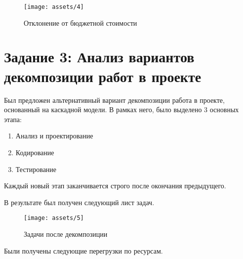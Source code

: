 \begin{figure}[H]
    \begin{center}
    \texttt{[image: assets/4]}
    \caption{Отклонение от бюджетной стоимости}
    \label{fig:4}
    \end{center}
\end{figure}

\section{Задание 3: Анализ вариантов декомпозиции работ в проекте}

Был предложен альтернативный вариант декомпозиции работа в проекте, основанный на каскадной модели. В рамках него, было выделено 3 основных этапа:

\begin{enumerate}
	\item Анализ и проектирование
	\item Кодирование
	\item Тестирование
\end{enumerate}

Каждый новый этап заканчивается строго после окончания предыдущего.

В результате был получен следующий лист задач.

\begin{figure}[H]
    \begin{center}
    \texttt{[image: assets/5]}
    \caption{Задачи после декомпозиции}
    \label{fig:5}
    \end{center}
\end{figure}

Были получены следующие перегрузки по ресурсам.

